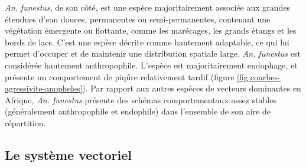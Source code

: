 \documentclass[12pt,twoside]{reedthesis}
\begin{document}
\emph{An. funestus}, de son côté, est une espèce majoritairement associée aux grandes étendues d'eau douces, permanentes ou semi-permanentes, contenant une végétation émergente ou flottante, comme les marécages, les grands étangs et les bords de lacs. C'est une espèce décrite comme hautement adaptable, ce qui lui permet d'occuper et de maintenir une distribution spatiale large. \emph{An. funestus} est considérée hautement anthropophile. L'espèce est majoritairement endophage, et présente un comportement de piqûre relativement tardif (figure \ref{fig:courbes-agressivite-anopheles}). Par rapport aux autres espèces de vecteurs dominantes en Afrique, \emph{An. funestus} présente des schémas comportementaux assez stables (généralement anthropophile et endophile) dans l'ensemble de son aire de répartition.\\

\hypertarget{le-systuxe8me-vectoriel}{%
\subsection{Le système vectoriel}\label{le-systuxe8me-vectoriel}}
\end{document}
